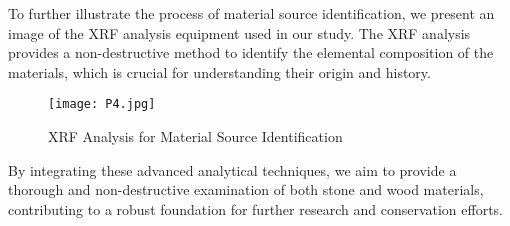 \documentclass{mcmthesis}
\begin{document}
To further illustrate the process of material source identification, we present an image of the XRF analysis equipment used in our study. The XRF analysis provides a non-destructive method to identify the elemental composition of the materials, which is crucial for understanding their origin and history.

\begin{figure}[htbp]
    \centering
    \texttt{[image: P4.jpg]} %
    \caption{XRF Analysis for Material Source Identification}
    \label{fig:XRF}
\end{figure}

By integrating these advanced analytical techniques, we aim to provide a thorough and non-destructive examination of both stone and wood materials, contributing to a robust foundation for further research and conservation efforts.







\end{document}
